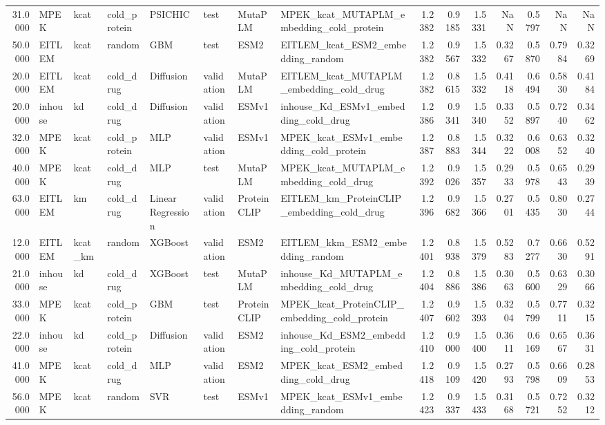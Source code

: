 \begin{tabular}{rlllllllrrrrrrr}
31.0000 & MPEK & kcat & cold_protein & PSICHIC & test & MutaPLM & MPEK_kcat_MUTAPLM_embedding_cold_protein & 1.2382 & 0.9185 & 1.5331 & NaN & 0.5797 & NaN & NaN \\
50.0000 & EITLEM & kcat & random & GBM & test & ESM2 & EITLEM_kcat_ESM2_embedding_random & 1.2382 & 0.9567 & 1.5332 & 0.3267 & 0.5870 & 0.7984 & 0.3269 \\
20.0000 & EITLEM & kcat & cold_drug & Diffusion & validation & MutaPLM & EITLEM_kcat_MUTAPLM_embedding_cold_drug & 1.2382 & 0.8615 & 1.5332 & 0.4118 & 0.6494 & 0.5830 & 0.4184 \\
20.0000 & inhouse & kd & cold_drug & Diffusion & validation & ESMv1 & inhouse_Kd_ESMv1_embedding_cold_drug & 1.2386 & 0.9341 & 1.5340 & 0.3352 & 0.5897 & 0.7240 & 0.3462 \\
32.0000 & MPEK & kcat & cold_protein & MLP & validation & ESMv1 & MPEK_kcat_ESMv1_embedding_cold_protein & 1.2387 & 0.8883 & 1.5344 & 0.3222 & 0.6008 & 0.6352 & 0.3240 \\
40.0000 & MPEK & kcat & cold_drug & MLP & test & MutaPLM & MPEK_kcat_MUTAPLM_embedding_cold_drug & 1.2392 & 0.9026 & 1.5357 & 0.2933 & 0.5978 & 0.6543 & 0.2939 \\
63.0000 & EITLEM & km & cold_drug & Linear Regression & validation & ProteinCLIP & EITLEM_km_ProteinCLIP_embedding_cold_drug & 1.2396 & 0.9682 & 1.5366 & 0.2701 & 0.5435 & 0.8030 & 0.2744 \\
12.0000 & EITLEM & kcat_km & random & XGBoost & validation & ESM2 & EITLEM_kkm_ESM2_embedding_random & 1.2401 & 0.8938 & 1.5379 & 0.5283 & 0.7277 & 0.6630 & 0.5291 \\
21.0000 & inhouse & kd & cold_drug & XGBoost & test & MutaPLM & inhouse_Kd_MUTAPLM_embedding_cold_drug & 1.2404 & 0.8886 & 1.5386 & 0.3063 & 0.5600 & 0.6329 & 0.3066 \\
33.0000 & MPEK & kcat & cold_protein & GBM & test & ProteinCLIP & MPEK_kcat_ProteinCLIP_embedding_cold_protein & 1.2407 & 0.9602 & 1.5393 & 0.3204 & 0.5799 & 0.7711 & 0.3215 \\
22.0000 & inhouse & kd & cold_protein & Diffusion & validation & ESM2 & inhouse_Kd_ESM2_embedding_cold_protein & 1.2410 & 0.9000 & 1.5400 & 0.3611 & 0.6169 & 0.6567 & 0.3631 \\
41.0000 & MPEK & kcat & cold_drug & MLP & validation & ESM2 & MPEK_kcat_ESM2_embedding_cold_drug & 1.2418 & 0.9109 & 1.5420 & 0.2793 & 0.5798 & 0.6609 & 0.2853 \\
56.0000 & MPEK & kcat & random & SVR & test & ESMv1 & MPEK_kcat_ESMv1_embedding_random & 1.2423 & 0.9337 & 1.5433 & 0.3168 & 0.5721 & 0.7252 & 0.3212 \\

\end{tabular}
